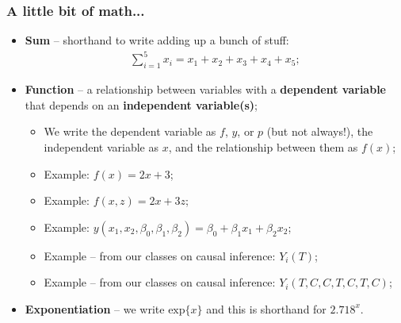 \documentclass[aspectratio=169]{beamer}
\theoremstyle{principle}
\begin{document}
\begin{frame}
\frametitle{A little bit of math...}

\begin{itemize}
\item \textbf{Sum} -- shorthand to write adding up a bunch of stuff:
\begin{align*}
\sum_{i=1}^{5}x_i = x_1 + x_2 + x_3 + x_4 + x_5;
\end{align*}

\item \textbf{Function} -- a relationship between variables with a \textbf{dependent variable} that depends on an \textbf{independent variable(s)};
\begin{itemize}
\item We write the dependent variable as $f$, $y$, or $p$ (but not always!), the independent variable as $x$, and the relationship between them as $f(x)$;
\item Example: $f(x) = 2x + 3$;
\item Example: $f(x,z) = 2x + 3z$;
\item Example: $y(x_1,x_2,\beta_0,\beta_1,\beta_2) = \beta_0 +\beta_1x_1 + \beta_2x_2$;
\item Example -- from our classes on causal inference: $Y_i(T)$;
\item Example -- from our classes on causal inference: $Y_i(T,C,C,T,C,T,C)$;
\end{itemize}
\bigskip

\item \textbf{Exponentiation} -- we write $\mbox{exp}\{x\}$ and this is shorthand for $2.718^x$.

\end{itemize}

\end{frame}
\end{document}
